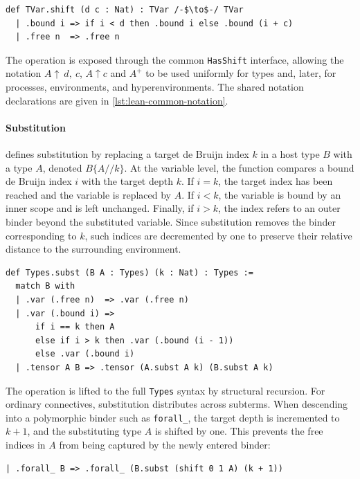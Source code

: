 \begin{lstlisting}[language=Lean4]
def TVar.shift (d c : Nat) : TVar /-$\to$-/ TVar
  | .bound i => if i < d then .bound i else .bound (i + c)
  | .free n  => .free n
\end{lstlisting}

The operation is exposed through the common \texttt{HasShift} interface, allowing the notation $A\uparrow~d,~c$, $A\uparrow{c}$ and $A^+$ to be used uniformly for types and, later, for processes, environments, and hyperenvironments. The shared notation declarations are given in \cref{lst:lean-common-notation}.

\paragraph{Substitution}  defines substitution by replacing a target de Bruijn index $k$ in a host type $B$ with a type $A$, denoted $B\{A // k\}$. At the variable level, the function compares a bound de Bruijn index $i$ with the target depth $k$. If $i = k$, the target index has been reached and the variable is replaced by $A$. If $i < k$, the variable is bound by an inner scope and is left unchanged. Finally, if $i > k$, the index refers to an outer binder beyond the substituted variable. Since substitution removes the binder corresponding to $k$, such indices are decremented by one to preserve their relative distance to the surrounding environment.

\begin{lstlisting}[language=Lean4]
def Types.subst (B A : Types) (k : Nat) : Types :=
  match B with
  | .var (.free n)  => .var (.free n)
  | .var (.bound i) =>
      if i == k then A
      else if i > k then .var (.bound (i - 1))
      else .var (.bound i)
  | .tensor A B => .tensor (A.subst A k) (B.subst A k)
\end{lstlisting}

The operation is lifted to the full \texttt{Types} syntax by structural recursion. For ordinary connectives, substitution distributes across subterms. When descending into a polymorphic binder such as \texttt{forall\_}, the target depth is incremented to $k+1$, and the substituting type $A$ is shifted by one. This prevents the free indices in $A$ from being captured by the newly entered binder:

\begin{lstlisting}[language=Lean4]
  | .forall_ B => .forall_ (B.subst (shift 0 1 A) (k + 1))
\end{lstlisting}

